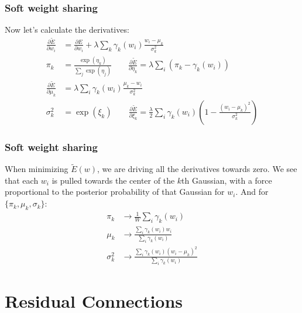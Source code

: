 \documentclass{beamer}
\begin{document}
\begin{frame}
    \frametitle{Soft weight sharing}
    Now let's calculate the derivatives:
    \begin{align*}
        \frac{\partial\tilde{E}}{\partial{}w_{i}}&=\frac{\partial{}E}{\partial{}w_{i}}+\lambda\sum_{k}\gamma_{k}(w_{i})\frac{w_{i}-\mu_{k}}{\sigma^{2}_{k}} \\
        \pi_{k}&=\frac{\exp(\eta_{k})}{\sum_{j}\exp(\eta_{j})}\qquad\frac{\partial\tilde{E}}{\partial\eta_{k}}=\lambda\sum_{i}(\pi_{k}-\gamma_{k}(w_{i})) \\
        \frac{\partial\tilde{E}}{\partial\mu_{k}}&=\lambda\sum_{i}\gamma_{k}(w_{i})\frac{\mu_{k}-w_{i}}{\sigma^{2}_{k}} \\
        \sigma^{2}_{k}&=\exp(\xi_{k})\qquad\frac{\partial\tilde{E}}{\partial\xi_{k}}=\frac{\lambda}{2}\sum_{i}\gamma_{k}(w_{i})(1-\frac{(w_{i}-\mu_{k})^{2}}{\sigma^{2}_{k}})
    \end{align*}
\end{frame}

\begin{frame}
    \frametitle{Soft weight sharing}
    When minimizing $\tilde{E}(w)$, we are driving all the derivatives towards zero. We see that each $w_{i}$ is pulled towards the center of the $k$th Gaussian, with a force proportional to the posterior probability of that Gaussian for $w_{i}$. And for $\{\pi_{k},\mu_{k},\sigma_{k}\}$:
    \begin{align*}
        \pi_{k}&\to\frac{1}{W}\sum_{i}\gamma_{k}(w_{i}) \\
        \mu_{k}&\to\frac{\sum_{i}\gamma_{k}(w_{i})w_{i}}{\sum_{i}\gamma_{k}(w_{i})} \\
        \sigma^{2}_{k}&\to\frac{\sum_{i}\gamma_{k}(w_{i})(w_{i}-\mu_{k})^{2}}{\sum_{i}\gamma_{k}(w_{i})}
    \end{align*}
\end{frame}

\section{Residual Connections}
\end{document}
